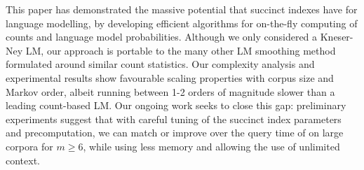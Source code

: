 This paper has demonstrated the massive potential that succinct indexes have for language modelling, by developing efficient algorithms for on-the-fly computing of \ngram counts and language model probabilities.
Although we only considered a Kneser-Ney LM, our approach is portable to the many other LM smoothing method formulated around similar count statistics.
Our complexity analysis and experimental results show favourable scaling properties with corpus size and Markov order, albeit running between 1-2 orders of magnitude slower than a leading count-based LM.
Our ongoing work seeks to close this gap: preliminary experiments suggest that with careful tuning of the succinct index parameters and precomputation, we can match or improve over the query time of \SRILM on large corpora for $m\ge6$, while using less memory and allowing the use of unlimited context.

